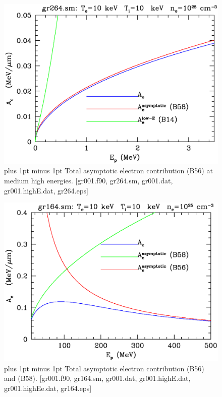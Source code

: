 \documentclass[preprint,12pt,eqsecnum,nofootinbib,amsmath,amssymb]{revtex4}
\newcommand{\footnoteskip}{\baselineskip 12pt plus 1pt minus 1pt}
\begin{document}
\pagebreak

\begin{figure}[h!]
\includegraphics[scale=0.45]{gr264.eps} 
\vskip-0.8cm 
\caption{\footnoteskip  
  Total asymptotic electron contribution (B56) at medium high
  energies.  [gr001.f90, gr264.sm, gr001.dat, gr001.highE.dat, gr264.eps]
}
\label{fig:gr264}
\end{figure}

\begin{figure}[h!]
\includegraphics[scale=0.45]{gr164.eps} 
\vskip-0.8cm 
\caption{\footnoteskip  
  Total asymptotic electron contribution (B56) and (B58).  [gr001.f90,
  gr164.sm, gr001.dat, gr001.highE.dat, gr001.highEe.dat, gr164.eps]
}
\label{fig:gr164}
\end{figure}
\end{document}
